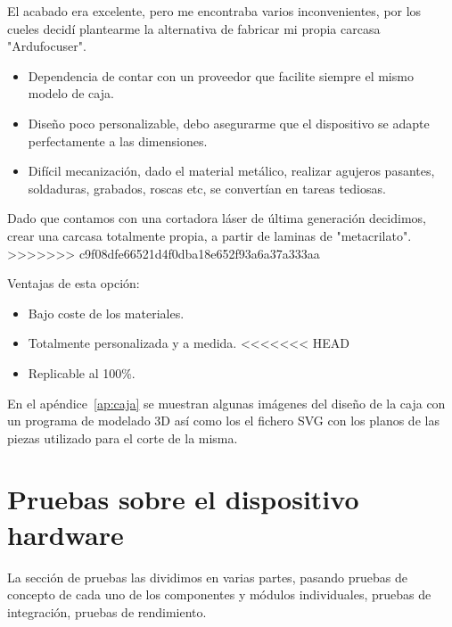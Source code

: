 El acabado era excelente, pero me encontraba varios inconvenientes, por los cueles decidí plantearme la alternativa de fabricar mi propia carcasa "Ardufocuser". 

\begin{itemize}
	\item Dependencia de contar con un proveedor que facilite siempre el mismo modelo de caja.
	\item Diseño poco personalizable, debo asegurarme que el dispositivo se adapte perfectamente a las dimensiones.
	\item  Difícil mecanización, dado el material metálico, realizar agujeros pasantes, soldaduras, grabados, roscas etc, se convertían en tareas tediosas. 
\end{itemize}

Dado que contamos con una cortadora láser de última generación decidimos, crear una carcasa totalmente propia, a partir de laminas de "metacrilato".
>>>>>>> c9f08dfe66521d4f0dba18e652f93a6a37a333aa

Ventajas de esta opción:

\begin{itemize}
	\item Bajo coste de los materiales. 
	\item Totalmente personalizada y a medida.
<<<<<<< HEAD
	\item Replicable al 100\%.
\end{itemize}

En el apéndice~\ref{ap:caja} se muestran algunas imágenes del diseño de la caja con un programa de modelado 3D así como los el fichero SVG con los planos de las piezas utilizado para el corte de la misma.


\section{Pruebas sobre el dispositivo hardware}

La sección de pruebas las dividimos en varias partes, pasando pruebas de concepto de cada uno de los componentes y módulos individuales, pruebas de integración, pruebas de rendimiento. 

